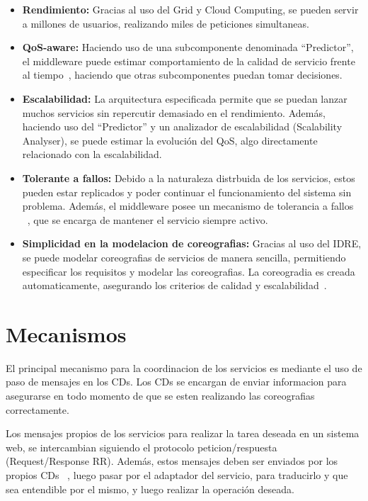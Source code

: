 \documentclass[runningheads]{llncs}
\begin{document}
\begin{itemize}
    \item \textbf{Rendimiento: }Gracias al uso del Grid y Cloud Computing, se pueden servir a millones de usuarios, realizando miles de peticiones simultaneas.~\cite{a_1}
    \item \textbf{QoS-aware: }Haciendo uso de una subcomponente denominada ``Predictor'', el middleware puede estimar comportamiento de la calidad de servicio frente al tiempo~\cite{a_10}, haciendo que otras subcomponentes puedan tomar decisiones. 
    \item \textbf{Escalabilidad: }La arquitectura especificada permite que se puedan lanzar muchos servicios sin repercutir demasiado en el rendimiento. Además, haciendo uso del ``Predictor'' y un analizador de escalabilidad (Scalability Analyser), se puede estimar la evolución del QoS, algo directamente relacionado con la escalabilidad. ~\cite{a_10}
    \item \textbf{Tolerante a fallos: }Debido a la naturaleza distrbuida de los servicios, estos pueden estar replicados y poder continuar el funcionamiento del sistema sin problema. Además, el middleware posee un mecanismo de tolerancia a fallos ~\cite{a_20}, que se encarga de mantener el servicio siempre activo.
    \item \textbf{Simplicidad en la modelacion de coreografias: }Gracias al uso del IDRE, se puede modelar coreografias de servicios de manera sencilla, permitiendo especificar los requisitos y modelar las coreografias. La coreogradia es creada automaticamente, asegurando los criterios de calidad y escalabilidad~\cite{a_2}.
\end{itemize}
\section{Mecanismos}
El principal mecanismo para la coordinacion de los servicios es mediante el uso de paso de mensajes en los CDs. Los CDs se encargan de enviar informacion para asegurarse en todo momento de que se esten realizando las coreografias correctamente. 

Los mensajes propios de los servicios para realizar la tarea deseada en un sistema web, se intercambian siguiendo el protocolo peticion/respuesta (Request/Response RR). Además, estos mensajes deben ser enviados por los propios CDs ~\cite{a_2}, luego pasar por el adaptador del servicio, para traducirlo y que sea entendible por el mismo, y luego realizar la operación deseada.
\end{document}
